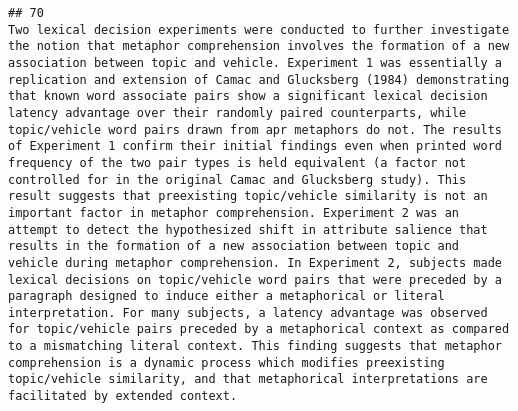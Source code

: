 \documentclass[
  english,
  man]{apa6}
\begin{document}
\begin{verbatim}
## 70                                                                                                                                                                                                                                                                                                                                                                                                                                                                                                                                                                                                                                                                                                                                                                                                                                                                                                                                                                                                                                                                                       Two lexical decision experiments were conducted to further investigate the notion that metaphor comprehension involves the formation of a new association between topic and vehicle. Experiment 1 was essentially a replication and extension of Camac and Glucksberg (1984) demonstrating that known word associate pairs show a significant lexical decision latency advantage over their randomly paired counterparts, while topic/vehicle word pairs drawn from apr metaphors do not. The results of Experiment 1 confirm their initial findings even when printed word frequency of the two pair types is held equivalent (a factor not controlled for in the original Camac and Glucksberg study). This result suggests that preexisting topic/vehicle similarity is not an important factor in metaphor comprehension. Experiment 2 was an attempt to detect the hypothesized shift in attribute salience that results in the formation of a new association between topic and vehicle during metaphor comprehension. In Experiment 2, subjects made lexical decisions on topic/vehicle word pairs that were preceded by a paragraph designed to induce either a metaphorical or literal interpretation. For many subjects, a latency advantage was observed for topic/vehicle pairs preceded by a metaphorical context as compared to a mismatching literal context. This finding suggests that metaphor comprehension is a dynamic process which modifies preexisting topic/vehicle similarity, and that metaphorical interpretations are facilitated by extended context.

\end{verbatim}
\end{document}
